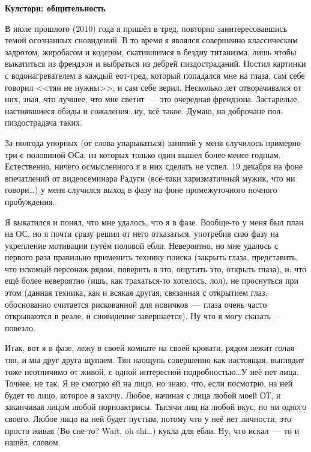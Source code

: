 \documentclass[a5paper,12pt,twoside]{memoir}
\begin{document}
\begin{shaded}

\begin{center}
\Large\textbf{Кулстори: общительность}
\end{center}


В июле прошлого (2010) года я пришёл в тред, повторно заинтересовавшись темой осознанных сновидений. В то время я являлся совершенно классическим задротом, жиробасом и кодером, скатившимся в бездну титанизма, лишь чтобы выкатиться из френдзон и выбраться из дебрей пиздостраданий. Постил картинки с водонагревателем в каждый еот-тред, который попадался мне на глаза, сам себе говорил <<тян не нужны>>, и сам себе верил. Несколько лет отворачивался от них, зная, что лучшее, что мне светит~--- это очередная френдзона. Застарелые, настоявшиеся обиды и сожаления\ldots ну, всё такое. Думаю, на доброчане пол-пиздострадача таких.

За полгода упорных (от слова упарываться) занятий у меня случилось примерно три с половиной ОСа, из которых только один вышел более-менее годным. Естественно, ничего осмысленного я в них сделать не успел. 19 декабря на фоне впечатлений от видеосеминара Радуги (всё-таки харизматичный мужик, что ни говори\ldots) у меня случился выход в фазу на фоне промежуточного ночного пробуждения.

Я выкатился и понял, что мне удалось, что я в фазе. Вообще-то у меня был план на ОС, но я почти сразу решил от него отказаться, употребив сию фазу на укрепление мотивации путём половой ебли. Невероятно, но мне удалось с первого раза правильно применить технику поиска (закрыть глаза, представить, что искомый персонаж рядом, поверить в это, ощутить это, открыть глаза), и, что ещё более невероятно (ишь, как трахаться-то хотелось, лол), не проснуться при этом (данная техника, как и всякая другая, связанная с открытием глаз, обоснованно считается рискованной для новичков~--- глаза очень часто открываются в реале, и сновидение завершается). Ну что я могу сказать~-- повезло.

Итак, вот я в фазе, лежу в своей комнате на своей кровати, рядом лежит голая тян, и мы друг друга щупаем. Тян наощупь совершенно как настоящая, выглядит тоже неотличимо от живой, с одной интересной подробностью\ldots У неё нет лица. Точнее, не так. Я не смотрю ей на лицо, но знаю, что, если посмотрю, на ней будет то лицо, которое я захочу. Любое, начиная с лица любой моей ОТ, и заканчивая лицом любой порноактрисы. Тысячи лиц на любой вкус, но ни одного своего. Любое лицо на ней будет пустым, потому что у неё нет личности, это просто живая (Во сне-то? Wait, oh shi\ldots) кукла для ебли. Ну, что искал~--- то и нашёл, словом.


\end{shaded}
\end{document}
